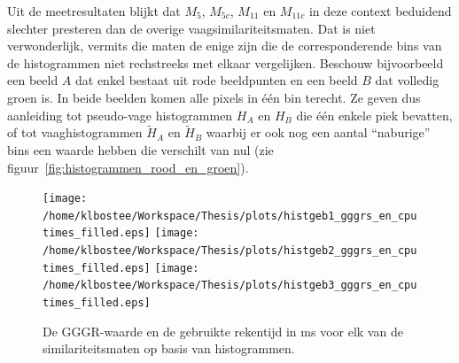Uit de meetresultaten blijkt dat $M_5$, $M_{5c}$, $M_{11}$ en $M_{11c}$ in deze context
beduidend slechter presteren dan de overige vaagsimilariteitsmaten. Dat is niet
verwonderlijk, vermits die maten de enige zijn die de corresponderende bins van de histogrammen 
niet rechstreeks met elkaar vergelijken. Beschouw bijvoorbeeld een beeld $A$ dat enkel bestaat
uit rode beeldpunten en een beeld $B$ dat volledig groen is. In beide beelden komen alle
pixels in \'e\'en bin terecht. Ze geven dus aanleiding tot pseudo-vage histogrammen $H_A$ en $H_B$  
die \'e\'en enkele piek bevatten, of tot vaaghistogrammen $\widetilde{H}_A$ en $\widetilde{H}_B$ 
waarbij er ook nog een aantal ``naburige'' bins een waarde hebben die verschilt van nul 
(zie figuur~\ref{fig:histogrammen_rood_en_groen}). 
\begin{figure}[p]
\centering
\texttt{[image: /home/klbostee/Workspace/Thesis/plots/histgeb1\_gggrs\_en\_cputimes\_filled.eps]} 
\texttt{[image: /home/klbostee/Workspace/Thesis/plots/histgeb2\_gggrs\_en\_cputimes\_filled.eps]}
\texttt{[image: /home/klbostee/Workspace/Thesis/plots/histgeb3\_gggrs\_en\_cputimes\_filled.eps]}
\vspace{1pt}
\caption{\label{fig:histgeb_gggrs_en_cputimes}De GGGR-waarde en de gebruikte rekentijd in ms voor elk 
van de similariteitsmaten op basis van histogrammen.}
\end{figure}
%
